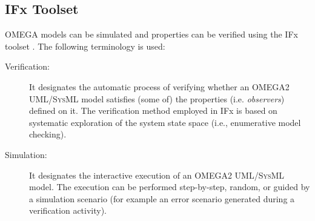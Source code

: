 \documentclass[a4paper,twoside]{article}
\def\sysml{\textsc{SysML}}
\def\uml{\textsc{UML}}
\begin{document}

\subsection{IFx Toolset}

\noindent OMEGA models can be simulated and properties can be verified using the IFx toolset \cite{11}. The following terminology is used: 

\begin{description}
\item[Verification:] It designates  the  automatic  process  of  verifying  whether  an  OMEGA2  \uml{}/\sysml{} model  satisfies  (some  of)  the  properties  (i.e. \textit{observers})  defined  on  it.  The  verification  method employed in IFx is based on systematic exploration of the system state space (i.e., enumerative model checking). 
\item[Simulation:] It designates  the  interactive  execution  of  an  OMEGA2  \uml{}/\sysml{}  model.  The execution  can    be  performed  step-by-step,  random,  or  guided  by  a  simulation  scenario  (for example an error scenario generated during a verification activity). 
\end{description}
\end{document}

